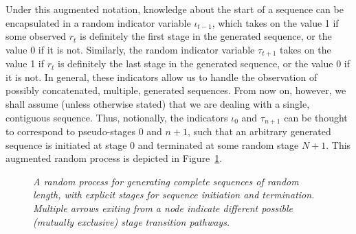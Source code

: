 \documentclass[a4paper]{article}
\begin{document}
Under this augmented notation, knowledge about the start of a sequence can be encapsulated in 
a random indicator variable $\iota_{t-1}$, which takes on the value 1 if some observed $r_{t}$ is definitely the first stage in the
generated sequence, or the value 0 if it is not. Similarly, the random indicator variable $\tau_{t+1}$
takes on the value 1 if $r_{t}$ is definitely the last stage in the generated sequence, or the value 0 if it is not.
In general, these indicators allow us to handle the observation of possibly concatenated, multiple, generated sequences.
From now on, however, we shall assume (unless otherwise stated) that we are dealing with a single, contiguous sequence.
Thus, notionally, the indicators $\iota_0$ and $\tau_{n+1}$ can be thought to correspond to pseudo-stages 0 and $n+1$, such that
an arbitrary generated sequence is initiated at stage 0 and terminated at some random stage $N+1$.
This augmented random process is depicted in Figure~\ref{fig:random-process}. 
\begin{figure}[hbt]
\centering
{}
\caption{\em A random process for generating complete sequences of random length,
with explicit stages for sequence initiation and termination. Multiple arrows exiting from a node indicate
different possible (mutually exclusive) stage transition pathways.}
\label{fig:random-process}
\end{figure}
\end{document}
